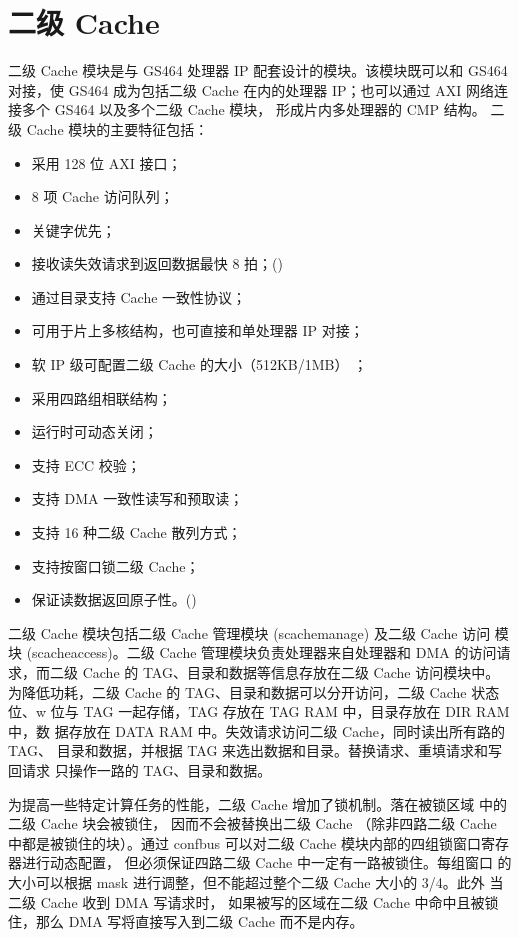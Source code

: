 \chapter{二级 Cache}

二级 Cache 模块是与 GS464 处理器 IP 配套设计的模块。该模块既可以和 GS464 对接，使 GS464 成为包括二级 Cache 在内的处理器 IP；也可以通过 AXI 网络连接多个 GS464 以及多个二级 Cache 模块， 形成片内多处理器的 CMP 结构。 二级 Cache 模块的主要特征包括：
\begin{itemize}
  \item 采用 128 位 AXI 接口；
  \item 8 项 Cache 访问队列；
  \item 关键字优先；
  \item 接收读失效请求到返回数据最快 8 拍；()
  \item 通过目录支持 Cache 一致性协议；
  \item 可用于片上多核结构，也可直接和单处理器 IP 对接；
  \item 软 IP 级可配置二级 Cache 的大小（512KB/1MB） ；
  \item 采用四路组相联结构；
  \item 运行时可动态关闭；
  \item 支持 ECC 校验；
  \item 支持 DMA 一致性读写和预取读；
  \item 支持 16 种二级 Cache 散列方式；
  \item 支持按窗口锁二级 Cache；
  \item 保证读数据返回原子性。()
\end{itemize}

二级 Cache 模块包括二级 Cache 管理模块 (scachemanage) 及二级 Cache 访问 模块
(scacheaccess)。二级 Cache 管理模块负责处理器来自处理器和 DMA 的访问请 求，而二级
Cache 的 TAG、目录和数据等信息存放在二级 Cache 访问模块中。为降低功耗，二级
Cache 的 TAG、目录和数据可以分开访问，二级 Cache 状态位、w 位与 TAG
一起存储，TAG 存放在 TAG RAM 中，目录存放在 DIR RAM 中，数 据存放在 DATA RAM
中。失效请求访问二级 Cache，同时读出所有路的 TAG、 目录和数据，并根据 TAG
来选出数据和目录。替换请求、重填请求和写回请求 只操作一路的 TAG、目录和数据。

为提高一些特定计算任务的性能，二级 Cache 增加了锁机制。落在被锁区域 中的二级
Cache 块会被锁住， 因而不会被替换出二级 Cache （除非四路二级 Cache 
中都是被锁住的块）。通过 confbus 可以对二级 Cache
模块内部的四组锁窗口寄存器进行动态配置， 但必须保证四路二级 Cache
中一定有一路被锁住。每组窗口 的大小可以根据 mask 进行调整，但不能超过整个二级
Cache 大小的 3/4。此外 当二级 Cache 收到 DMA 写请求时， 如果被写的区域在二级
Cache 中命中且被锁 住，那么 DMA 写将直接写入到二级 Cache 而不是内存。

